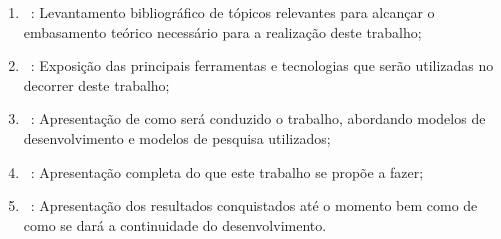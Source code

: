 \begin{enumerate}
	\item ~: Levantamento bibliográfico de tópicos relevantes para alcançar o embasamento teórico necessário para a realização deste trabalho;
	\item ~: Exposição das principais ferramentas e tecnologias que serão utilizadas no decorrer deste trabalho;
	\item ~: Apresentação de como será conduzido o trabalho, abordando modelos de desenvolvimento e modelos de pesquisa utilizados;
	\item ~: Apresentação completa do que este trabalho se propõe a fazer;
	\item ~: Apresentação dos resultados conquistados até o momento bem como de como se dará a continuidade do desenvolvimento.
\end{enumerate}
